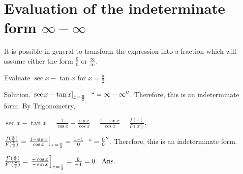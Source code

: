 

\section{Evaluation of the indeterminate form $\infty-\infty$}
\label{sec:114}

It is possible in general to transform the expression into a fraction 
which will assume either the form $\frac{0}{0}$ or $\frac{\infty}{\infty}$.

\begin{example}
Evaluate $\sec x -\tan x$ for $x = \frac{\pi}{2}$.

Solution. 
$\left. \sec x - \tan x \right]_{x= \frac{\pi}{2}} \ \ ``= \infty - \infty''$. 
Therefore, this is an indeterminate form.
By Trigonometry, 

$\sec x - \tan x = \frac{1}{\cos x} - \frac{\sin x}{\cos x} 
= \frac{1 - \sin x}{\cos x} = \frac{f(x)}{F(x)}$.

$\frac{ f(\frac{\pi}{2}) }{ F(\frac{\pi}{2}) } 	
= \left. \frac{1 - \sin x}{\cos x} \right]_{x = \frac{\pi}{2}} 
= \frac{1 - 1}{0}\ \ `` = \frac{0}{0}''$. 
Therefore, this is an indeterminate form.

$
\frac{ f'(\frac{\pi}{2}) }{ F'(\frac{\pi}{2}) } 	
= \left. \frac{-\cos x}{-\sin x} \right]_{x = \frac{\pi}{2}} 
= \frac{0}{-1} = 0. \ \ {\rm Ans.}
$
\end{example}

